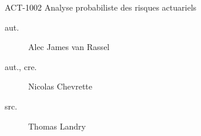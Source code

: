 \begin{contrib}{ACT-1002\: Analyse probabiliste des risques actuariels}
    \begin{description}
        \item[aut.] Alec James van Rassel
        \item[aut., cre.] Nicolas Chevrette
        \item[src.] Thomas Landry
    \end{description}
    \end{contrib}